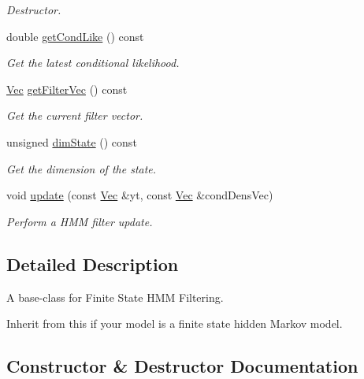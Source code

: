 \begin{DoxyCompactItemize}
\begin{DoxyCompactList}\small\item\em Destructor. \end{DoxyCompactList}\item 
double \hyperlink{classFSHMM_a38325b38c4f20521f50cc7891d44839d}{get\+Cond\+Like} () const 
\begin{DoxyCompactList}\small\item\em Get the latest conditional likelihood. \end{DoxyCompactList}\item 
\hyperlink{apf__filter_8h_a4c7df05c6f5e8a0d15ae14bcdbc07152}{Vec} \hyperlink{classFSHMM_af58a522cbeb2afa6a9211ac75100c1c2}{get\+Filter\+Vec} () const 
\begin{DoxyCompactList}\small\item\em Get the current filter vector. \end{DoxyCompactList}\item 
unsigned \hyperlink{classFSHMM_a2f166ff74c89b2103477be60eeb098d1}{dim\+State} () const 
\begin{DoxyCompactList}\small\item\em Get the dimension of the state. \end{DoxyCompactList}\item 
void \hyperlink{classFSHMM_a6a9c239a6de129579cc659269c6bc03f}{update} (const \hyperlink{apf__filter_8h_a4c7df05c6f5e8a0d15ae14bcdbc07152}{Vec} \&yt, const \hyperlink{apf__filter_8h_a4c7df05c6f5e8a0d15ae14bcdbc07152}{Vec} \&cond\+Dens\+Vec)
\begin{DoxyCompactList}\small\item\em Perform a H\+MM filter update. \end{DoxyCompactList}\end{DoxyCompactItemize}


\subsection{Detailed Description}
A base-\/class for Finite State H\+MM Filtering. 

Inherit from this if your model is a finite state hidden Markov model. 

\subsection{Constructor \& Destructor Documentation}
